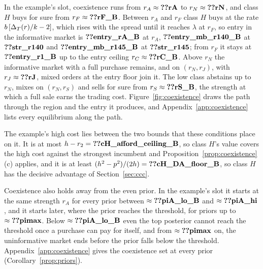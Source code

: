 In the example's slot, coexistence runs from \(r_A\approx\reg{rA}\) to \(r_N\approx\reg{rN}\), and class \(H\) buys
for sure from \(r_F\approx\reg{rF_B}\). Between \(r_A\) and \(r_F\) class \(H\) buys at the rate
\(b\,[\Delta_T(r)/k-2]\), which rises with the spread until it reaches \(\lambda\) at \(r_F\), so entry in the informative
market is \(\reg{entry_rA_B}\) at \(r_A\), \(\reg{entry_mb_r140_B}\) at \(\reg{str_r140}\) and
\(\reg{entry_mb_r145_B}\) at \(\reg{str_r145}\); from \(r_F\) it stays at \(\reg{entry_r1_B}\) up to the entry
ceiling \(r_C\approx\reg{rC_B}\). Above \(r_N\) the informative market with a full purchase remains, and on
\((r_N,r_J)\), with \(r_J\approx\reg{rJ}\), mixed orders at the entry floor join it. The low class abstains up to
\(r_N\), mixes on \((r_N,r_S)\) and sells for sure from \(r_S\approx\reg{rS_B}\), the strength at which a full sale
earns the trading cost. Figure~\ref{fig:coexistence} draws the path through the region and the entry it produces,
and Appendix~\ref{app:coexistence} lists every equilibrium along the path.

The example's high cost lies between the two bounds that these conditions place on it. It is at most
\(h-r_2=\reg{cH_afford_ceiling_B}\), so class \(H\)'s value covers the high cost against the strongest incumbent
and Proposition~\ref{prop:coexistence}(c) applies, and it is at least \((h^2-p^2)/(2h)=\reg{cH_DA_floor_B}\), so
class \(H\) has the decisive advantage of Section~\ref{sec:ccc}.

Coexistence also holds away from the even prior. In the example's slot it starts at the same strength \(r_A\) for
every prior between \(\approx\reg{piA_lo_B}\) and \(\approx\reg{piA_hi}\), and it starts later, where the prior
reaches the threshold, for priors up to \(\approx\reg{pimax}\). Below \(\approx\reg{piA_lo_B}\) even the top
posterior cannot reach the threshold once a purchase can pay for itself, and from \(\approx\reg{pimax}\) on, the
uninformative market ends before the prior falls below the threshold. Appendix~\ref{app:coexistence} gives the coexistence
set at every prior (Corollary~\ref{prop:priors}).
